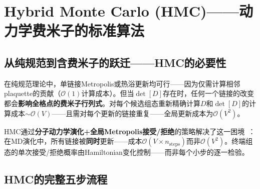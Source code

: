\documentclass[12pt,a4paper]{ctexart}
\theoremstyle{definition}
\begin{document}
\section{Hybrid Monte Carlo (HMC)——动力学费米子的标准算法}

\subsection{从纯规范到含费米子的跃迁——HMC的必要性}

在纯规范理论中，单链接Metropolis或热浴更新均可行——因为仅需计算相邻plaquette的贡献（$\mathcal{O}(1)$计算成本）。但当$\det[D]$存在时，任何一个链接的改变都会\textbf{影响全格点的费米子行列式}。对每个候选组态重新精确计算$D$和$\det[D]$的计算成本$\sim \mathcal{O}(V)$——且需对每个更新的链接重复——全局更新成本为$\mathcal{O}(V^2)$。

HMC通过\textbf{分子动力学演化+全局Metropolis接受/拒绝}的策略解决了这一困境~\cite{GattringerLang2010}：在MD演化中，所有链接被\textbf{同时}更新——成本$\mathcal{O}(V \times n_{\text{steps}})$而非$\mathcal{O}(V^2)$。终端组态的单次接受/拒绝概率由Hamiltonian变化控制——而非每个小步的逐一检验。

\subsection{HMC的完整五步流程}
\end{document}
